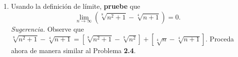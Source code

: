 \documentclass[12pt]{article}
\begin{document}
\begin{enumerate}
\begin{proof}
        De (II): Sea $\varepsilon>0$, por la propiedad arquimediana de los números reales, existe $N\in\mathbb{N}$ tal que $\frac{1}{N}< \varepsilon^2$ (donde $\varepsilon^2>0$), es decir, $\frac{1}{\sqrt{N}}< \varepsilon$. Por tanto, si $n\in \mathbb{N}$ es tal que $n\geq N$, entonces
        \begin{equation*}
            \begin{split}
                \abs{\sqrt{n+1}-\sqrt{n}-0}=&\abs{\sqrt{n+1}-\sqrt{n}}\\
                \leq&\frac{1}{2\sqrt{n}}\\
                \leq&\frac{1}{2\sqrt{N}}\\
                <&\frac{1}{2}\varepsilon\\
                <&\varepsilon
            \end{split}
        \end{equation*}
        \qed
    \end{proof}
    \item Usando la definición de límite, \textbf{pruebe} que
        \begin{equation}
            \lim_{n\rightarrow\infty}\left(\sqrt[8]{n^2+1}-\sqrt[4]{n+1}\right)=0.
        \end{equation}
        \textit{Sugerencia.} Observe que $\sqrt[8]{n^2+1}-\sqrt[4]{n+1}=\left[\sqrt[8]{n^2+1}-\sqrt[8]{n^2}\right]+\left[\sqrt[4]{n}-\sqrt[4]{n+1}\right]$. Proceda ahora de manera similar al Problema \textbf{2.4}.
        

\end{enumerate}
\end{document}
